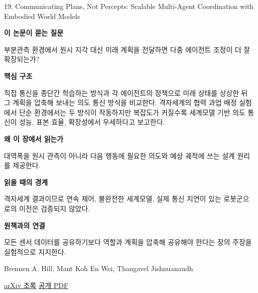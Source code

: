 \documentclass[11pt,openany]{book}
\begin{document}
\begin{termcard}{19. Communicating Plans, Not Percepts: Scalable Multi-Agent Coordination with Embodied World Models}

\par

\medskip

{\sffamily\bfseries\color{deepblue} 이 논문이 묻는 질문}\par

부분관측 환경에서 원시 지각 대신 미래 계획을 전달하면 다중 에이전트 조정이 더 잘 확장되는가?

\smallskip

{\sffamily\bfseries\color{deepblue} 핵심 구조}\par

직접 통신을 종단간 학습하는 방식과 각 에이전트의 정책으로 미래 상태를 상상한 뒤 그 계획을 압축해 보내는 의도 통신 방식을 비교한다. 격자세계의 협력 과업 배정 실험에서 단순 환경에서는 두 방식이 작동하지만 복잡도가 커질수록 세계모델 기반 의도 통신이 성능, 표본 효율, 확장성에서 우세하다고 보고한다.

\smallskip

{\sffamily\bfseries\color{deepblue} 왜 이 장에서 읽는가}\par

대역폭을 원시 관측이 아니라 다음 행동에 필요한 의도와 예상 궤적에 쓰는 설계 원리를 제공한다.

\smallskip

{\sffamily\bfseries\color{coral} 읽을 때의 경계}\par

격자세계 결과이므로 연속 제어, 불완전한 세계모델, 실제 통신 지연이 있는 로봇군으로의 이전은 검증되지 않았다.

\smallskip

{\sffamily\bfseries\color{teal} 원책과의 연결}\par

모든 센서 데이터를 공유하기보다 역할과 계획을 압축해 공유해야 한다는 장의 주장을 실험적으로 지지한다.

\medskip

{\footnotesize\color{muted} Brennen A. Hill, Mant Koh En Wei, Thangavel Jishnuanandh\par

\href{https://arxiv.org/abs/2508.02912}{arXiv 초록} \quad \href{https://arxiv.org/pdf/2508.02912}{공개 PDF}\par}

\end{termcard}
\end{document}
